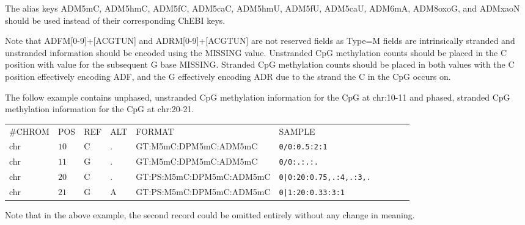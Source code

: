 \documentclass[8pt]{article}
\begin{document}
\begin{itemize}
  The alias keys ADM5mC, ADM5hmC, ADM5fC, ADM5caC, ADM5hmU, ADM5fU, ADM5caU, ADM6mA, ADM8oxoG, and ADMxaoN should be used instead of their corresponding ChEBI keys.

  Note that ADFM[0-9]+[ACGTUN] and ADRM[0-9]+[ACGTUN] are not reserved fields as Type=M fields are intrinsically stranded and unstranded information should be encoded using the MISSING value.
  Unstranded CpG methylation counts should be placed in the C position with value for the subsequent G base MISSING.
  Stranded CpG methylation counts should be placed in both values with the C position effectively encoding ADF, and the G effectively encoding ADR due to the strand the C in the CpG occurs on.

  The follow example contains unphased, unstranded CpG methylation information for the CpG at chr:10-11 and phased, stranded CpG methylation information for the CpG at chr:20-21.

\vspace{0.5em}
\begin{tabular}{ l l l l l l l l l l}
	\#CHROM & POS & REF & ALT & FORMAT & SAMPLE\\
	chr & $10$ & C & .         & GT:M5mC:DPM5mC:ADM5mC       & \tt{0/0:0.5:2:1}\\
	chr & $11$ & G & .         & GT:M5mC:DPM5mC:ADM5mC       & \tt{0/0:.:.:.}\\
	chr & $20$ & C & .         & GT:PS:M5mC:DPM5mC:ADM5mC       & \tt{0|0:20:0.75,.:4,.:3,.}\\
	chr & $21$ & G & A         & GT:PS:M5mC:DPM5mC:ADM5mC       & \tt{0|1:20:0.33:3:1}\\
\end{tabular}

  Note that in the above example, the second record could be omitted entirely without any change in meaning.



\end{itemize}
\end{document}
